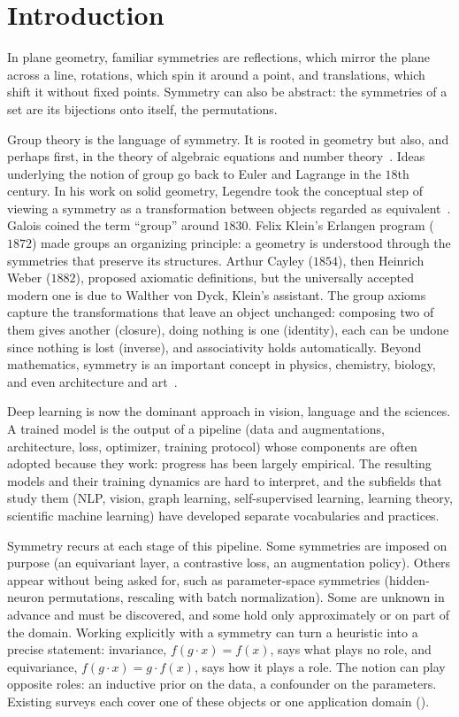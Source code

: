 \documentclass[mathematics,review,submit,moreauthors]{Definitions/mdpi}
\begin{document}
\tableofcontents

\section{Introduction}

In plane geometry, familiar symmetries are reflections, which mirror the plane across a line, rotations, which spin it around a point, and translations, which shift it without fixed points.
Symmetry can also be abstract: the symmetries of a set are its bijections onto itself, the permutations.

Group theory is the language of symmetry.
It is rooted in geometry but also, and perhaps first, in the theory of algebraic equations and number theory~\citep{wussing1984}.
Ideas underlying the notion of group go back to Euler and Lagrange in the $18$th century.
In his work on solid geometry, Legendre took the conceptual step of viewing a symmetry as a transformation between objects regarded as equivalent~\citep{legendre1794,hon2008fststmoarsc}.
Galois coined the term ``group'' around $1830$.
Felix Klein's Erlangen program ($1872$) made groups an organizing principle: a geometry is understood through the symmetries that preserve its structures.
Arthur Cayley ($1854$), then Heinrich Weber ($1882$), proposed axiomatic definitions, but the universally accepted modern one is due to Walther von Dyck, Klein's assistant.
The group axioms capture the transformations that leave an object unchanged: composing two of them gives another (closure), doing nothing is one (identity), each can be undone since nothing is lost (inverse), and associativity holds automatically.
Beyond mathematics, symmetry is an important concept in physics, chemistry, biology, and even architecture and art~\citep{weyl1952,makse2025}.

Deep learning is now the dominant approach in vision, language and the sciences.
A trained model is the output of a pipeline (data and augmentations, architecture, loss, optimizer, training protocol) whose components are often adopted because they work: progress has been largely empirical.
The resulting models and their training dynamics are hard to interpret, and the subfields that study them (NLP, vision, graph learning, self-supervised learning, learning theory, scientific machine learning) have developed separate vocabularies and practices.

Symmetry recurs at each stage of this pipeline.
Some symmetries are imposed on purpose (an equivariant layer, a contrastive loss, an augmentation policy).
Others appear without being asked for, such as parameter-space symmetries (hidden-neuron permutations, rescaling with batch normalization).
Some are unknown in advance and must be discovered, and some hold only approximately or on part of the domain.
Working explicitly with a symmetry can turn a heuristic into a precise statement: invariance, $f(g\cdot x)=f(x)$, says what plays no role, and equivariance, $f(g\cdot x)=g\cdot f(x)$, says how it plays a role.
The notion can play opposite roles: an inductive prior on the data, a confounder on the parameters.
Existing surveys each cover one of these objects or one application domain ().
\end{document}
